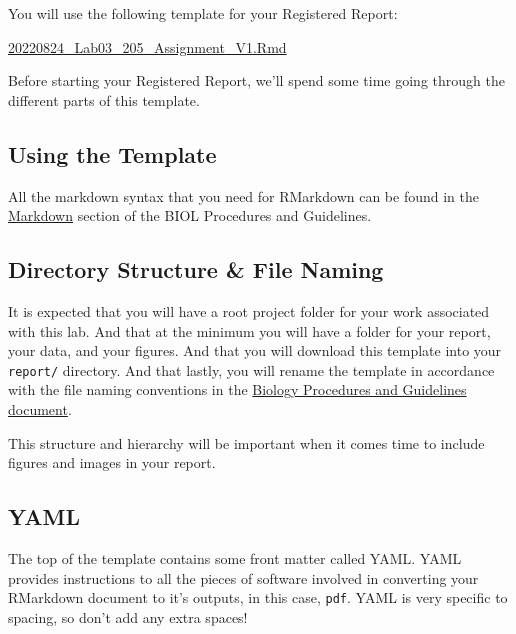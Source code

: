 \documentclass[
]{book}
\begin{document}
You will use the following template for your Registered Report:

\href{https://osf.io/download/g5zxk}{20220824\_Lab03\_205\_Assignment\_V1.Rmd}

Before starting your Registered Report, we'll spend some time going through the different parts of this template.

\hypertarget{using-the-template}{%
\subsection*{Using the Template}\label{using-the-template}}

All the markdown syntax that you need for RMarkdown can be found in the \href{https://ubco-biology.github.io/Procedures-and-Guidelines/markdown-1.html}{Markdown} section of the BIOL Procedures and Guidelines.

\hypertarget{directory-structure-file-naming}{%
\subsection*{Directory Structure \& File Naming}\label{directory-structure-file-naming}}

It is expected that you will have a root project folder for your work associated with this lab. And that at the minimum you will have a folder for your report, your data, and your figures. And that you will download this template into your \texttt{report/} directory. And that lastly, you will rename the template in accordance with the file naming conventions in the \href{https://ubco-biology.github.io/Procedures-and-Guidelines/file-naming.html}{Biology Procedures and Guidelines document}.

This structure and hierarchy will be important when it comes time to include figures and images in your report.

\hypertarget{yaml}{%
\subsection*{YAML}\label{yaml}}

The top of the template contains some front matter called YAML. YAML provides instructions to all the pieces of software involved in converting your RMarkdown document to it's outputs, in this case, \texttt{pdf}. YAML is very specific to spacing, so don't add any extra spaces!
\end{document}
